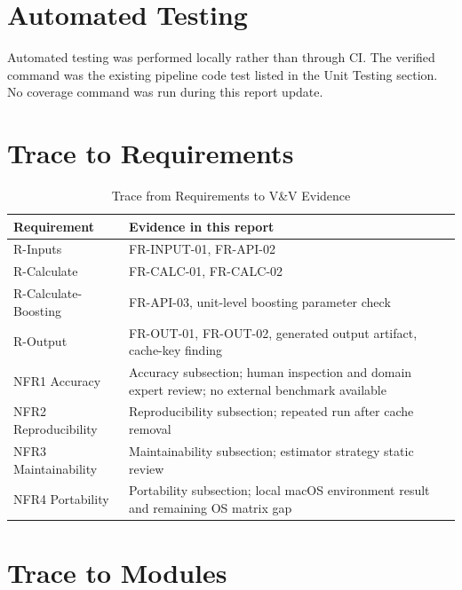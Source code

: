 \documentclass[12pt, titlepage]{article}
\begin{document}
\section{Automated Testing}

Automated testing was performed locally rather than through CI. The verified command was the existing pipeline code test listed in the Unit Testing section. No coverage command was run during this report update.

\section{Trace to Requirements}

\begin{table}[h!]
\centering
\begin{tabularx}{\textwidth}{p{}X}
\toprule
\textbf{Requirement} & \textbf{Evidence in this report}\\
\midrule
R-Inputs & FR-INPUT-01, FR-API-02\\
R-Calculate & FR-CALC-01, FR-CALC-02\\
R-Calculate-Boosting & FR-API-03, unit-level boosting parameter check\\
R-Output & FR-OUT-01, FR-OUT-02, generated output artifact, cache-key finding\\
NFR1 Accuracy & Accuracy subsection; human inspection and domain expert review; no external benchmark available\\
NFR2 Reproducibility & Reproducibility subsection; repeated run after cache removal\\
NFR3 Maintainability & Maintainability subsection; estimator strategy static review\\
NFR4 Portability & Portability subsection; local macOS environment result and remaining OS matrix gap\\
\bottomrule
\end{tabularx}
\caption{Trace from Requirements to V\&V Evidence}
\label{tab:req-trace}
\end{table}

\section{Trace to Modules}
\end{document}
